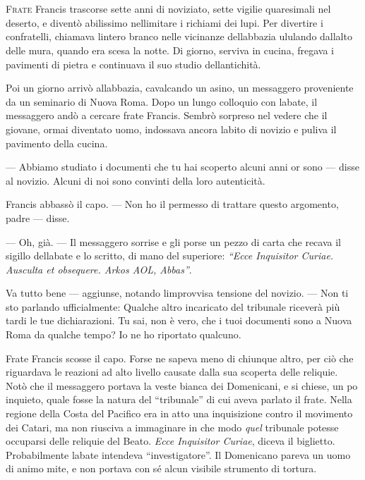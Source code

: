 	\chapter{\phantom{title}}

\lettrine{F}{rate} Francis trascorse sette anni di noviziato, sette vigilie
quaresimali nel deserto, e diventò abilissimo
nell\textquotesingle imitare i richiami dei lupi. Per divertire i
confratelli, chiamava l\textquotesingle intero branco nelle vicinanze
dell\textquotesingle abbazia ululando dall\textquotesingle alto delle
mura, quando era scesa la notte. Di giorno, serviva in cucina, fregava i
pavimenti di pietra e continuava il suo studio
dell\textquotesingle antichità.

Poi un giorno arrivò all\textquotesingle abbazia, cavalcando un asino,
un messaggero proveniente da un seminario di Nuova Roma. Dopo un lungo
colloquio con l\textquotesingle abate, il messaggero andò a cercare
frate Francis. Sembrò sorpreso nel vedere che il giovane, ormai
diventato uomo, indossava ancora l\textquotesingle abito di novizio e
puliva il pavimento della cucina.

--- Abbiamo studiato i documenti che tu hai scoperto alcuni anni or sono
--- disse al novizio. Alcuni di noi sono convinti della loro
autenticità.

Francis abbassò il capo. --- Non ho il permesso di trattare questo
argomento, padre --- disse.

--- Oh, già. --- Il messaggero sorrise e gli porse un pezzo di carta che
recava il sigillo dell\textquotesingle abate e lo scritto, di mano del
superiore: \emph{``Ecce Inquisitor Curiae. Ausculta et obsequere. Arkos
	AOL, Abbas''}.

Va tutto bene --- aggiunse, notando l\textquotesingle improvvisa
tensione del novizio. --- Non ti sto parlando ufficialmente: Qualche
altro incaricato del tribunale riceverà più tardi le tue dichiarazioni.
Tu sai, non è vero, che i tuoi documenti sono a Nuova Roma da qualche
tempo? Io ne ho riportato qualcuno.

Frate Francis scosse il capo. Forse ne sapeva meno di chiunque altro,
per ciò che riguardava le reazioni ad alto livello causate dalla sua
scoperta delle reliquie. Notò che il messaggero portava la veste bianca
dei Domenicani, e si chiese, un po\textquotesingle{} inquieto, quale
fosse la natura del ``tribunale'' di cui aveva parlato il frate. Nella
regione della Costa del Pacifico era in atto una inquisizione contro il
movimento dei Catari, ma non riusciva a immaginare in che modo
\emph{quel} tribunale potesse occuparsi delle reliquie del Beato.
\emph{Ecce Inquisitor Curiae}, diceva il biglietto. Probabilmente
l\textquotesingle abate intendeva ``investigatore''. Il Domenicano
pareva un uomo di animo mite, e non portava con sé alcun visibile
strumento di tortura.

